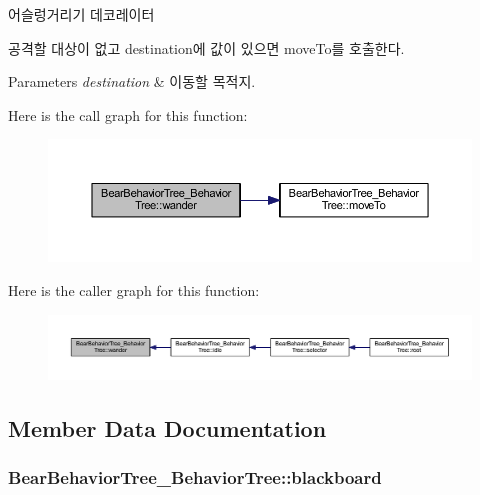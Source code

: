 어슬렁거리기 데코레이터 

공격할 대상이 없고 destination에 값이 있으면 move\+To를 호출한다. 
\begin{DoxyParams}{Parameters}
{\em destination} & 이동할 목적지. \\
\hline
\end{DoxyParams}


Here is the call graph for this function\+:\nopagebreak
\begin{figure}[H]
\begin{center}
\leavevmode
\includegraphics[width=350pt]{class_bear_behavior_tree___behavior_tree_a0dcee292ae4de16888b71b3eafcfa6a9_cgraph}
\end{center}
\end{figure}




Here is the caller graph for this function\+:\nopagebreak
\begin{figure}[H]
\begin{center}
\leavevmode
\includegraphics[width=350pt]{class_bear_behavior_tree___behavior_tree_a0dcee292ae4de16888b71b3eafcfa6a9_icgraph}
\end{center}
\end{figure}




\subsection{Member Data Documentation}
\subsubsection[{\texorpdfstring{blackboard}{blackboard}}]{ Bear\+Behavior\+Tree\+\_\+\+Behavior\+Tree\+::blackboard\hspace{0.3cm}{\ttfamily [private]}}\hypertarget{class_bear_behavior_tree___behavior_tree_af65805184758188534eb2100723629d7}{}\label{class_bear_behavior_tree___behavior_tree_af65805184758188534eb2100723629d7}
